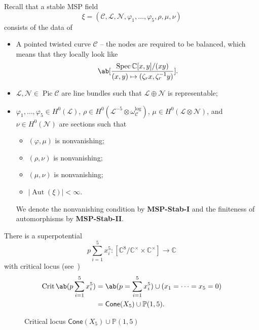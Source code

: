 \documentclass[10pt]{amsart}
\theoremstyle{definition}
\theoremstyle{remark}
\theoremstyle{plain}
\theoremstyle{definition}
\theoremstyle{remark}
\newcommand{\C}{\mathbb{C}}
\renewcommand{\P}{\mathbb{P}}
\newcommand{\mc}[1]{\mathcal{#1}}
\newcommand{\on}[1]{\operatorname{#1}}
\newcommand{\ms}[1]{\mathsf{#1}}
\newcommand{\1}{\mathbf{1}}
\newcommand{\2}{\mathbf{2}}
\newcommand{\3}{\mathbf{3}}
\DeclareMathOperator{\Aut}{Aut}
\DeclareMathOperator{\Pic}{Pic}
\DeclareMathOperator{\Spec}{Spec}
\begin{document}
Recall that a stable MSP field
\[ \xi = (\mc{C}, \mc{L}, \mc{N}, \varphi_1, \ldots, \varphi_5, \rho, \mu, \nu) \]
consists of the data of
\begin{itemize}
    \item A pointed twisted curve $\mc{C}$ -- the nodes are required to be balanced, which means that they locally look like
        \[ \ab[\frac{\Spec \C[x,y]/(xy)}{(x,y) \mapsto (\zeta_r x, \zeta_r^{-1}y)}]. \]
    \item $\mc{L}, \mc{N} \in \Pic \mc{C}$ are line bundles such that $\mc{L} \oplus \mc{N}$ is representable;
    \item $\varphi_1, \ldots, \varphi_5 \in H^0(\mc{L})$, $\rho \in H^0(\mc{L}^{-5} \otimes \omega_{\mc{C}}^{\log})$, $\mu \in H^0(\mc{L} \otimes \mc{N})$, and $\nu \in H^0(\mc{N})$ are sections such that
        \begin{itemize}
            \item $(\varphi, \mu)$ is nonvanishing;
            \item $(\rho, \nu)$ is nonvanishing;
            \item $(\mu, \nu)$ is nonvanishing;
            \item $|\Aut(\xi)|< \infty$.
        \end{itemize}
        We denote the nonvanishing condition by \textbf{MSP-Stab-I} and the finiteness of automorphisms by \textbf{MSP-Stab-II}.
\end{itemize}
There is a superpotential
\[ p \sum_{i=1}^5 x_i^5 \colon [\C^8 / \C^{\times} \times \C^{\times}] \to \C \]
with critical locus (see~)
\begin{align*}
    \on{Crit} \ab(p \sum_{i=1}^5 x_i^5) &= \ab(p = \sum_{i=1}^5 x_i^5) \cup (x_1 = \cdots = x_5 = 0) \\
    &= \ms{Cone}(X_5) \cup \P(1,5).
\end{align*}
\begin{figure}[htpb]
\begin{center}
\end{center}
\caption{Critical locus $\ms{Cone}(X_5) \cup \P(1,5)$}%
\label{fig:crit}
\end{figure}
\end{document}
